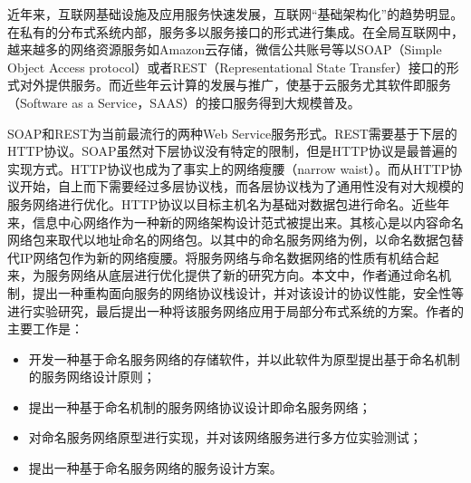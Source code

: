 \begin{cabstract}
   近年来，互联网基础设施及应用服务快速发展，互联网“基础架构化”的趋势明显。在私有的分布式系统内部，服务多以服务接口的形式进行集成。在全局互联网中，越来越多的网络资源服务如Amazon云存储，微信公共账号等以SOAP（Simple Object Access protocol）或者REST（Representational State Transfer）接口的形式对外提供服务。而近些年云计算的发展与推广，使基于云服务尤其软件即服务（Software as a Service，SAAS）的接口服务得到大规模普及。

   SOAP和REST为当前最流行的两种Web Service服务形式。REST需要基于下层的HTTP协议。SOAP虽然对下层协议没有特定的限制，但是HTTP协议是最普遍的实现方式。HTTP协议也成为了事实上的网络瘦腰（narrow waist）。而从HTTP协议开始，自上而下需要经过多层协议栈，而各层协议栈为了通用性没有对大规模的服务网络进行优化。HTTP协议以目标主机名为基础对数据包进行命名。近些年来，信息中心网络作为一种新的网络架构设计范式被提出来。其核心是以内容命名网络包来取代以地址命名的网络包。以其中的命名服务网络为例，以命名数据包替代IP网络包作为新的网络瘦腰。将服务网络与命名数据网络的性质有机结合起来，为服务网络从底层进行优化提供了新的研究方向。本文中，作者通过命名机制，提出一种重构面向服务的网络协议栈设计，并对该设计的协议性能，安全性等进行实验研究，最后提出一种将该服务网络应用于局部分布式系统的方案。作者的主要工作是：

  \begin{itemize}
    \item 开发一种基于命名服务网络的存储软件，并以此软件为原型提出基于命名机制的服务网络设计原则；
    \item 提出一种基于命名机制的服务网络协议设计即命名服务网络；
    \item 对命名服务网络原型进行实现，并对该网络服务进行多方位实验测试；
    \item 提出一种基于命名服务网络的服务设计方案。
  \end{itemize}
\end{cabstract}


